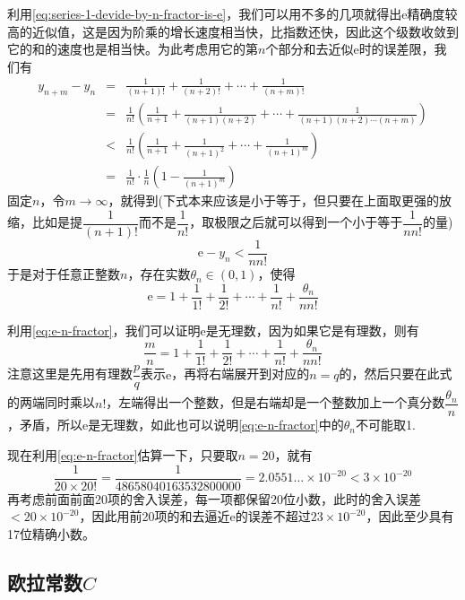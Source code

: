 利用\autoref{eq:series-1-devide-by-n-fractor-is-e}，我们可以用不多的几项就得出$\mathrm{e}$精确度较高的近似值，这是因为阶乘的增长速度相当快，比指数还快，因此这个级数收敛到它的和的速度也是相当快。为此考虑用它的第$n$个部分和去近似$\mathrm{e}$时的误差限，我们有
\begin{eqnarray*}
  y_{n+m}-y_n & = & \frac{1}{(n+1)!}+\frac{1}{(n+2)!}+\cdots+\frac{1}{(n+m)!} \\
              & = & \frac{1}{n!} \left( \frac{1}{n+1}+\frac{1}{(n+1)(n+2)}+\cdots+\frac{1}{(n+1)(n+2)\cdots(n+m)} \right) \\
              & < & \frac{1}{n!} \left( \frac{1}{n+1}+\frac{1}{(n+1)^2}+\cdots+\frac{1}{(n+1)^m} \right) \\
              & = & \frac{1}{n!} \cdot \frac{1}{n} \left(1-\frac{1}{(n+1)^m} \right)
\end{eqnarray*}
固定$n$，令$m \to \infty$，就得到(下式本来应该是小于等于，但只要在上面取更强的放缩，比如是提$\dfrac{1}{(n+1)!}$而不是$\dfrac{1}{n!}$，取极限之后就可以得到一个小于等于$\dfrac{1}{nn!}$的量)
\[ \mathrm{e}-y_n < \frac{1}{nn!} \]
于是对于任意正整数$n$，存在实数$\theta_n \in (0,1)$，使得
\begin{equation}
  \label{eq:e-n-fractor}
 \mathrm{e} = 1+\frac{1}{1!}+\frac{1}{2!}+\cdots+\frac{1}{n!}+\frac{\theta_n}{nn!} 
\end{equation}

利用\autoref{eq:e-n-fractor}，我们可以证明$\mathrm{e}$是无理数，因为如果它是有理数，则有
 \[ \frac{m}{n} = 1+\frac{1}{1!}+\frac{1}{2!}+\cdots+\frac{1}{n!}+\frac{\theta_n}{nn!} \]
注意这里是先用有理数$\dfrac{p}{q}$表示$\mathrm{e}$，再将右端展开到对应的$n=q$的，然后只要在此式的两端同时乘以$n!$，左端得出一个整数，但是右端却是一个整数加上一个真分数$\dfrac{\theta_n}{n}$，矛盾，所以$\mathrm{e}$是无理数，如此也可以说明\autoref{eq:e-n-fractor}中的$\theta_n$不可能取1.

现在利用\autoref{eq:e-n-fractor}估算一下，只要取$n=20$，就有
\[ \frac{1}{20\times 20!}=\frac{1}{48658040163532800000}= 2.0551\ldots \times 10^{-20} < 3 \times 10^{-20} \]
再考虑前面前面20项的舍入误差，每一项都保留20位小数，此时的舍入误差$<20\times 10^{-20}$，因此用前20项的和去逼近$\mathrm{e}$的误差不超过$23 \times 10^{-20}$，因此至少具有17位精确小数。

\subsection{欧拉常数$C$}
\label{sec:euler-constant}

